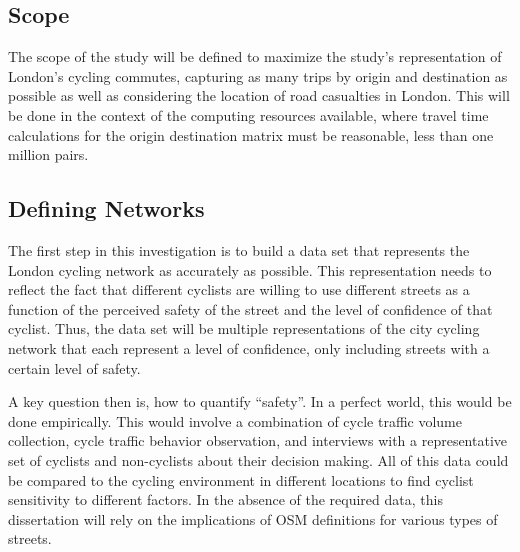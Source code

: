 


\subsection{Scope}

The scope of the study will be defined to maximize the study's representation of London's cycling commutes, capturing as many trips by origin and destination as possible as well as considering the location of road casualties in London. This will be done in the context of the computing resources available, where travel time calculations for the origin destination matrix must be reasonable, less than one million pairs. 

\subsection{Defining Networks}

The first step in this investigation is to build a data set that represents the London cycling network as accurately as possible. This representation needs to reflect the fact that different cyclists are willing to use different streets as a function of the perceived safety of the street and the level of confidence of that cyclist. Thus, the data set will be multiple representations of the city cycling network that each represent a level of confidence, only including streets with a certain level of safety. 

A key question then is, how to quantify ``safety''. In a perfect world, this would be done empirically. This would involve a combination of cycle traffic volume collection, cycle traffic behavior observation, and interviews with a representative set of cyclists and non-cyclists about their decision making. All of this data could be compared to the cycling environment in different locations to find cyclist sensitivity to different factors. In the absence of the required data, this dissertation will rely on the implications of OSM definitions for various types of streets. 

